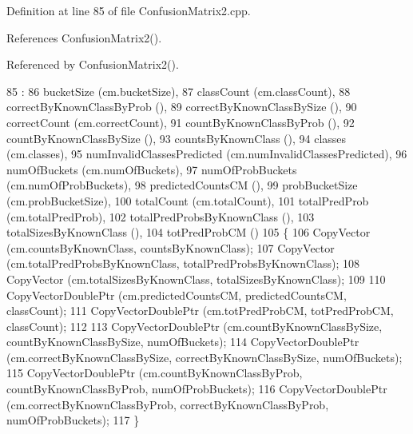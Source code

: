 Definition at line 85 of file Confusion\+Matrix2.\+cpp.



References Confusion\+Matrix2().



Referenced by Confusion\+Matrix2().


\begin{DoxyCode}
85                                                               :
86   bucketSize                  (cm.bucketSize),
87   classCount                  (cm.classCount),
88   correctByKnownClassByProb   (),
89   correctByKnownClassBySize   (),
90   correctCount                (cm.correctCount),
91   countByKnownClassByProb     (),
92   countByKnownClassBySize     (),
93   countsByKnownClass          (),
94   classes                     (cm.classes),
95   numInvalidClassesPredicted  (cm.numInvalidClassesPredicted),
96   numOfBuckets                (cm.numOfBuckets),
97   numOfProbBuckets            (cm.numOfProbBuckets),
98   predictedCountsCM           (),
99   probBucketSize              (cm.probBucketSize),
100   totalCount                  (cm.totalCount),
101   totalPredProb               (cm.totalPredProb),
102   totalPredProbsByKnownClass  (),
103   totalSizesByKnownClass      (),
104   totPredProbCM               ()
105 \{
106   CopyVector (cm.countsByKnownClass,         countsByKnownClass);
107   CopyVector (cm.totalPredProbsByKnownClass, totalPredProbsByKnownClass);
108   CopyVector (cm.totalSizesByKnownClass,     totalSizesByKnownClass);
109 
110   CopyVectorDoublePtr (cm.predictedCountsCM, predictedCountsCM,   classCount);
111   CopyVectorDoublePtr (cm.totPredProbCM,     totPredProbCM,       classCount);
112 
113   CopyVectorDoublePtr (cm.countByKnownClassBySize,   countByKnownClassBySize,   numOfBuckets);
114   CopyVectorDoublePtr (cm.correctByKnownClassBySize, correctByKnownClassBySize, numOfBuckets);
115   CopyVectorDoublePtr (cm.countByKnownClassByProb,   countByKnownClassByProb,   numOfProbBuckets);
116   CopyVectorDoublePtr (cm.correctByKnownClassByProb, correctByKnownClassByProb, numOfProbBuckets);
117 \}
\end{DoxyCode}
